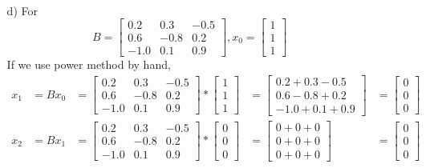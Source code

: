 \documentclass[10pt,a4paper, margin=1in]{article}
\begin{document}
\begin{enumerate}
\begin{enumerate}
\begin{align*}
    	\end{align*}
    	\item[d)] For $$B = \begin{bmatrix}
    	0.2&0.3&-0.5\\
    	0.6&-0.8&0.2\\
    	-1.0&0.1&0.9
    	\end{bmatrix}, x_0 = \begin{bmatrix} 1\\1\\1 \end{bmatrix}$$
    	If we use power method by hand,
    	\begin{align*}
    	x_1 &= Bx_0 &= \begin{bmatrix}
    	0.2&0.3&-0.5\\
    	0.6&-0.8&0.2\\
    	-1.0&0.1&0.9
    	\end{bmatrix} * \begin{bmatrix} 1\\1\\1 \end{bmatrix} &= \begin{bmatrix} 0.2+0.3-0.5\\0.6-0.8+0.2\\-1.0+0.1+0.9 \end{bmatrix} &= \begin{bmatrix} 0\\0\\0 \end{bmatrix}\\
    	x_2 &= Bx_1 &= \begin{bmatrix}
    	0.2&0.3&-0.5\\
    	0.6&-0.8&0.2\\
    	-1.0&0.1&0.9
    	\end{bmatrix} * \begin{bmatrix} 0\\0\\0 \end{bmatrix} &= \begin{bmatrix} 0+0+0\\0+0+0\\0+0+0 \end{bmatrix} &= \begin{bmatrix} 0\\0\\0 \end{bmatrix}\\
    	\end{align*}

\end{enumerate}
\end{enumerate}
\end{document}

